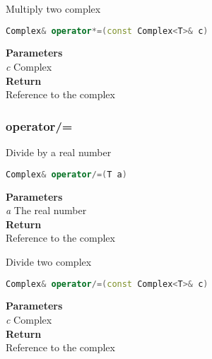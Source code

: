 \begin{mdframed}
Multiply two complex
\begin{lstlisting}[language=C++]
Complex& operator*=(const Complex<T>& c)
\end{lstlisting}
\textbf{Parameters} \\ 
\textit{c} Complex \\ 
\textbf{Return} \\ 
Reference to the complex\\ 
\end{mdframed}

\subsubsection{operator/=}
\begin{mdframed}
Divide by a real number
\begin{lstlisting}[language=C++]
Complex& operator/=(T a)
\end{lstlisting}
\textbf{Parameters} \\ 
\textit{a} The real number  \\ 
\textbf{Return} \\ 
Reference to the complex\\ 
\end{mdframed}

\begin{mdframed}
Divide two complex
\begin{lstlisting}[language=C++]
Complex& operator/=(const Complex<T>& c)
\end{lstlisting}
\textbf{Parameters} \\ 
\textit{c} Complex \\ 
\textbf{Return} \\ 
Reference to the complex\\ 
\end{mdframed}


